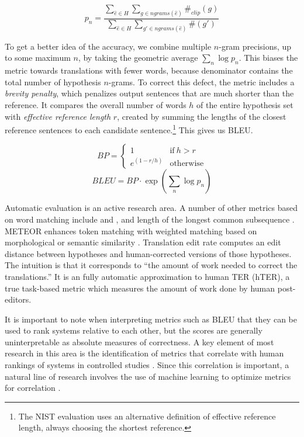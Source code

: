 \begin{displaymath}
	p_n = \frac{\sum_{\hat{e} \in H} \sum_{g \in ngrams(\hat{e})} \#_{clip}(g)}{\sum_{\hat{e} \in H} \sum_{g' \in ngrams(\hat{e})} \#(g')}
\end{displaymath}	

\noindent To get a better idea of the accuracy, we combine
multiple $n$-gram precisions, up to some maximum $n$,
by taking the geometric average $\sum_n \log p_n$.
This biases the metric towards translations with fewer words, 
because denominator contains the total number of hypothesis $n$-grams.
To correct this defect, the metric includes a {\em brevity penalty}, which penalizes
output sentences that are much shorter than the reference.  It compares
the overall number of words $h$ of the entire hypothesis set with
{\em effective reference length} $r$, created by summing the lengths
of the closest reference sentences to each candidate sentence.\footnote{
The NIST evaluation uses an alternative definition of effective reference
length, always choosing the shortest reference.}
This gives us BLEU.

\begin{displaymath}
	BP = \left\{\begin{array}{ll} 
		1 & \mathrm{if~} h > r \\
		e^{(1-r/h)} & \mathrm{otherwise}
	\end{array} \right.
\end{displaymath}
\begin{displaymath}
	BLEU = BP \cdot \exp \left( \sum_n \log p_n \right)
\end{displaymath}

Automatic evaluation is an active research area.
A number of other metrics based on word matching include 
and  \citep{Melamed:2003:naacl-short},
and length of the longest common subsequence \citep{Lin:2004:acl}. 
METEOR enhances token matching
with weighted matching based on morphological
or semantic similarity \citep{banerjee:2005:mteval}.  Translation edit rate \citep[TER;][]{Snover:2006:amta} computes an edit
distance between hypotheses and human-corrected versions
of those hypotheses.  The intuition is that it corresponds
to ``the amount of work needed to correct the translations.'' 
It is an fully automatic approximation to human TER (hTER), a true
task-based metric which measures the amount of work done by human
post-editors.

It is important to note when interpreting metrics
such as BLEU that they can be used to rank systems relative 
to each other, but the scores are generally uninterpretable 
as absolute measures of correctness.  A key element of most research
in this area is the identification of metrics that correlate
with human rankings of systems in controlled studies 
\citep{Papineni:2002:acl,Callison-Burch:2007:smt}. 
Since this correlation is important, a natural line of
research involves the use of machine learning to optimize
metrics for correlation
\citep{Kulesza:2004:tmi,Russo-Lassner:2005:tr,Lita:2005:hlt-emnlp,Liu:2007:hlt-naacl,Albrecht:2007:acl}.

